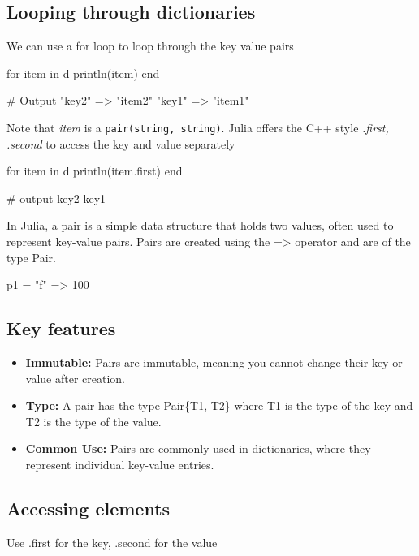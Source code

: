 \documentclass{report}
\begin{document}
     \bigbreak \noindent 
     \subsection{Looping through dictionaries}
     \bigbreak \noindent 
     We can use a for loop to loop through the key value pairs
     \bigbreak \noindent 
     \begin{jlcode}
     for item in d
         println(item)
     end

     # Output
     "key2" => "item2"
     "key1" => "item1"
     \end{jlcode}
     \bigbreak \noindent 
     Note that \textit{item} is a \texttt{pair(string, string)}. Julia offers the C++ style \textit{.first, .second} to access the key and value separately
     \bigbreak \noindent 
     \begin{jlcode}
         for item in d
             println(item.first)
         end

         # output
         key2
         key1
     \end{jlcode}

     \pagebreak 
     \bigbreak \noindent 
     In Julia, a pair is a simple data structure that holds two values, often used to represent key-value pairs. Pairs are created using the => operator and are of the type Pair.
     \bigbreak \noindent 
     \begin{jlcode}
     p1 = "f" => 100
     \end{jlcode}

     \bigbreak \noindent 
     \subsection{Key features}
     \bigbreak \noindent 
     \begin{itemize}
         \item \textbf{Immutable:} Pairs are immutable, meaning you cannot change their key or value after creation.
         \item \textbf{Type:} A pair has the type Pair\{T1, T2\} where T1 is the type of the key and T2 is the type of the value.
         \item \textbf{Common Use:} Pairs are commonly used in dictionaries, where they represent individual key-value entries.
     \end{itemize}

     \bigbreak \noindent 
     \subsection{Accessing elements}
     \bigbreak \noindent 
     Use .first for the key, .second for the value
\end{document}
